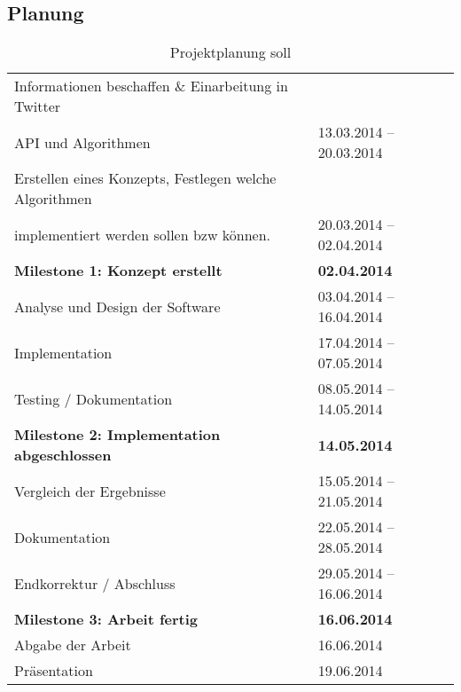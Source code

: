 \subsection{Planung}
\label{subsec:planung}
\begin{table}[H]
\begin{center}
\begin{tabular}{|l|l|}
	\hline
	Informationen beschaffen \& Einarbeitung in Twitter & \\
	API und Algorithmen & 13.03.2014 – 20.03.2014\\ \hline
	Erstellen eines Konzepts, Festlegen welche Algorithmen & \\
	implementiert werden sollen bzw können. & 20.03.2014 – 02.04.2014\\ \hline
	\textbf{Milestone 1: Konzept erstellt} & \textbf{02.04.2014}\\ \hline
	Analyse und Design der Software & 03.04.2014 – 16.04.2014\\ \hline
	Implementation & 17.04.2014 – 07.05.2014\\ \hline
	Testing / Dokumentation & 08.05.2014 – 14.05.2014\\ \hline
	\textbf{Milestone 2: Implementation abgeschlossen} & \textbf{14.05.2014} \\ \hline
	Vergleich der Ergebnisse & 15.05.2014 – 21.05.2014\\ \hline
	Dokumentation & 22.05.2014 – 28.05.2014\\ \hline
	Endkorrektur / Abschluss & 29.05.2014 – 16.06.2014\\ \hline
	\textbf{Milestone 3: Arbeit fertig} & \textbf{16.06.2014} \\ \hline
	Abgabe der Arbeit & 16.06.2014 \\ \hline
	Präsentation & 19.06.2014 \\ \hline
\end{tabular}
\caption{Projektplanung soll}
\end{center}
\end{table}
